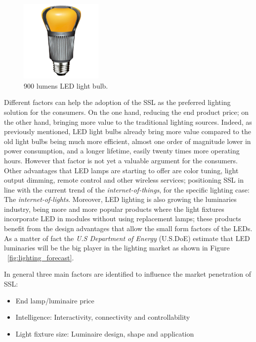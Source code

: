 \vspace{5mm} %


\begin{figure}[!h]
\centering
\includegraphics[width=4cm]{./0_intro/img/enduraled-12w.jpg}
\caption{900 lumens LED light bulb.}
\label{fig:l_prize}
\end{figure}

Different factors can help the adoption of the SSL as the preferred lighting solution for the consumers. On the one hand, reducing the end product price; on the other hand, bringing more value to the traditional lighting sources. Indeed, as previously mentioned, LED light bulbs already bring more value compared to the old light bulbs being much more efficient, almost one order of magnitude lower in power consumption, and a longer lifetime, easily twenty times more operating hours. However that factor is not yet a valuable argument for the consumers. Other advantages that LED lamps are starting to offer are color tuning, light output dimming, remote control and other wireless services; positioning SSL in line with the current trend of the \emph{internet-of-things}, for the specific lighting case: The \emph{internet-of-lights}. Moreover, LED lighting is also growing the luminaries industry, being more and more popular  products where the light fixtures incorporate LED in modules without using replacement lamps; these products benefit from the design advantages that allow the small form factors of the LEDs. As a matter of fact the \emph{U.S Department of Energy} (U.S.DoE) estimate that LED luminaries will be the big player in the lighting market as shown in Figure ~\ref{fig:lighting_forecast}.

In general three main factors are identified to influence the market penetration of SSL:
\begin{itemize}
  \item End lamp/luminaire price
  \item Intelligence: Interactivity, connectivity and controllability\
  \item Light fixture size: Luminaire design, shape and application
\end{itemize}

